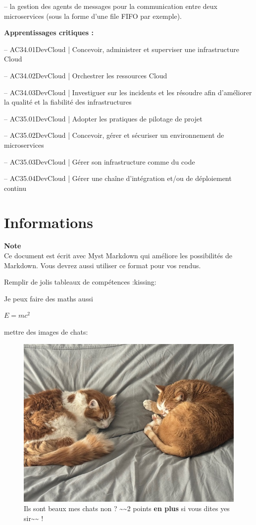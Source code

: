 \documentclass{article}
\begin{document}
-- la gestion des agents de messages pour la communication entre deux microservices (sous la forme d'une file FIFO par
exemple).

\textbf{Apprentissages critiques :}

-- AC34.01DevCloud | Concevoir, administrer et superviser une infrastructure Cloud

-- AC34.02DevCloud | Orchestrer les ressources Cloud

-- AC34.03DevCloud | Investiguer sur les incidents et les résoudre afin d'améliorer la qualité et la fiabilité des infrastructures

-- AC35.01DevCloud | Adopter les pratiques de pilotage de projet

-- AC35.02DevCloud | Concevoir, gérer et sécuriser un environnement de microservices

-- AC35.03DevCloud | Gérer son infrastructure comme du code

-- AC35.04DevCloud | Gérer une chaîne d'intégration et/ou de déploiement continu

\section{Informations}

\begin{framed}
\textbf{Note}\\
Ce document est écrit avec Myst Markdown qui améliore les possibilités de Markdown. Vous devrez aussi utiliser ce format pour vos rendus.
\end{framed}

Remplir de jolis tableaux de compétences :kissing:

Je peux faire des maths aussi

$E=mc^2$

mettre des images de chats:

\begin{figure}[!htbp]
\centering
\includegraphics[width=0.625\linewidth]{files/chats-00ce8bd69eb8aebbc2204cc6d332458f.jpg}
\caption*{Ils sont beaux mes chats non ? {\textasciitilde}{\textasciitilde}2 points \textbf{en plus} si vous dites yes sir{\textasciitilde}{\textasciitilde} !}
\end{figure}
\end{document}
